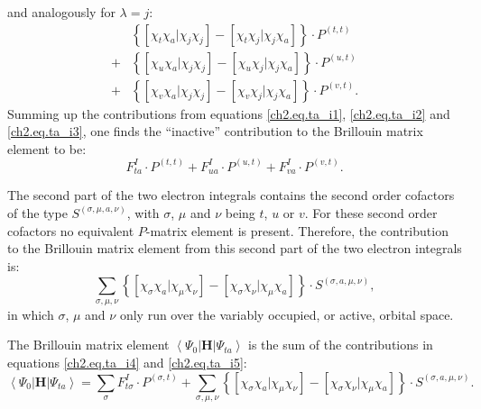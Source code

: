 and analogously for $\lambda = j$:
\begin{equation}
\begin{split}
&\left\{ \left[ \chi_t \chi_a | \chi_j \chi_j \right] - \left[ \chi_t \chi_j | \chi_j \chi_a \right] \right\} \cdot P^{(t,t)}\\
+&\left\{ \left[ \chi_u \chi_a | \chi_j \chi_j \right] - \left[ \chi_u \chi_j | \chi_j \chi_a \right] \right\} \cdot P^{(u,t)}\\
+&\left\{ \left[ \chi_v \chi_a | \chi_j \chi_j \right] - \left[ \chi_v \chi_j | \chi_j \chi_a \right] \right\} \cdot P^{(v,t)}.
\end{split}
\label{ch2.eq.ta_i3}
\end{equation}
Summing up the contributions from equations \ref{ch2.eq.ta_i1}, \ref{ch2.eq.ta_i2} and \ref{ch2.eq.ta_i3}, one finds the ``inactive'' contribution to the Brillouin matrix element to be:
\begin{equation}
F^{I}_{ta} \cdot P^{(t,t)} + F^{I}_{ua} \cdot P^{(u,t)} + F^{I}_{va} \cdot P^{(v,t)}.
\label{ch2.eq.ta_i4}
\end{equation}

The second part of the two electron integrals contains the second order cofactors of the type $S^{(\sigma,\mu,a,\nu)}$, with $\sigma$, $\mu$ and $\nu$ being $t$, $u$ or $v$. For these second order cofactors no equivalent $P$-matrix element is present. Therefore, the contribution to the Brillouin matrix element from this second part of the two electron integrals is:
\begin{equation}
\sum_{\sigma,\mu,\nu} \left\{ \left[ \chi_\sigma \chi_a | \chi_\mu \chi_\nu \right] - \left[ \chi_\sigma \chi_\nu | \chi_\mu \chi_a \right] \right\} \cdot S^{(\sigma,a,\mu,\nu)},
\label{ch2.eq.ta_i5}
\end{equation}
in which $\sigma$, $\mu$ and $\nu$ only run over the variably occupied, or active, orbital space.

The Brillouin matrix element $\left< \Psi_0 | \mathbf{H} | \Psi_{ta} \right>$ is the sum of the contributions in equations \ref{ch2.eq.ta_i4} and \ref{ch2.eq.ta_i5}:
\begin{equation}
\left< \Psi_0 | \mathbf{H} | \Psi_{ta} \right> = \sum_{\sigma} F^{I}_{t\sigma} \cdot P^{(\sigma,t)} + \sum_{\sigma,\mu,\nu} \left\{ \left[ \chi_\sigma \chi_a | \chi_\mu \chi_\nu \right] - \left[ \chi_\sigma \chi_\nu | \chi_\mu \chi_a \right] \right\} \cdot S^{(\sigma,a,\mu,\nu)}.
\label{ch2.eq.ta_i6}
\end{equation}

